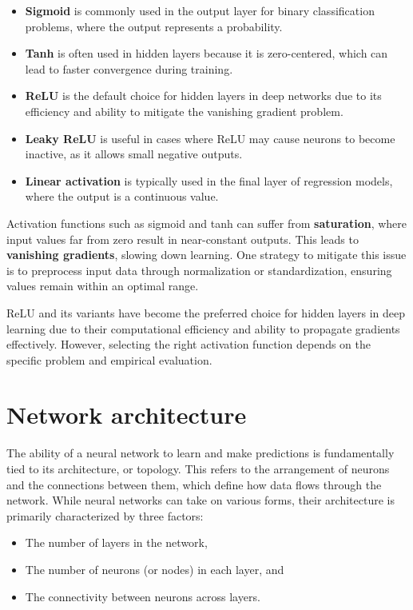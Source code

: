 \documentclass[
  11pt,
]{book}
\providecommand{\tightlist}{%
  \setlength{\itemsep}{0pt}\setlength{\parskip}{0pt}}
\theoremstyle{definition}
\theoremstyle{definition}
\theoremstyle{definition}
\theoremstyle{definition}
\theoremstyle{remark}
\begin{document}
\begin{itemize}
\tightlist
\item
  \textbf{Sigmoid} is commonly used in the output layer for binary classification problems, where the output represents a probability.
\item
  \textbf{Tanh} is often used in hidden layers because it is zero-centered, which can lead to faster convergence during training.\\
\item
  \textbf{ReLU} is the default choice for hidden layers in deep networks due to its efficiency and ability to mitigate the vanishing gradient problem.\\
\item
  \textbf{Leaky ReLU} is useful in cases where ReLU may cause neurons to become inactive, as it allows small negative outputs.\\
\item
  \textbf{Linear activation} is typically used in the final layer of regression models, where the output is a continuous value.
\end{itemize}

Activation functions such as sigmoid and tanh can suffer from \textbf{saturation}, where input values far from zero result in near-constant outputs. This leads to \textbf{vanishing gradients}, slowing down learning. One strategy to mitigate this issue is to preprocess input data through normalization or standardization, ensuring values remain within an optimal range.

ReLU and its variants have become the preferred choice for hidden layers in deep learning due to their computational efficiency and ability to propagate gradients effectively. However, selecting the right activation function depends on the specific problem and empirical evaluation.

\section{Network architecture}\label{network-architecture}

The ability of a neural network to learn and make predictions is fundamentally tied to its architecture, or topology. This refers to the arrangement of neurons and the connections between them, which define how data flows through the network. While neural networks can take on various forms, their architecture is primarily characterized by three factors:

\begin{itemize}
\tightlist
\item
  The number of layers in the network,\\
\item
  The number of neurons (or nodes) in each layer, and\\
\item
  The connectivity between neurons across layers.
\end{itemize}
\end{document}

